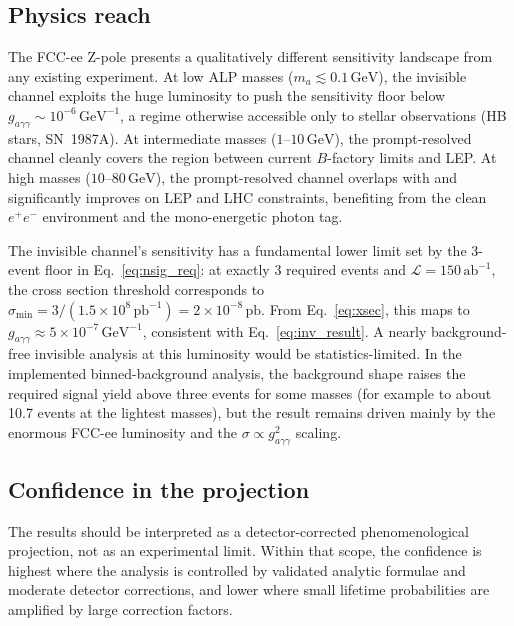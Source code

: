 \documentclass[12pt,a4paper]{article}
\newcommand{\alp}{a}
\newcommand{\gagg}{g_{a\gamma\gamma}}
\newcommand{\Lint}{\mathcal{L}}
\newcommand{\GeV}{\,\text{GeV}}
\newcommand{\abinv}{\,\text{ab}^{-1}}
\begin{document}
\subsection{Physics reach}

The FCC-ee Z-pole presents a qualitatively different sensitivity landscape
from any existing experiment.
At low ALP masses ($m_\alp \lesssim 0.1\GeV$), the invisible channel exploits
the huge luminosity to push the sensitivity floor below
$\gagg \sim 10^{-6}\GeV^{-1}$, a regime otherwise accessible only to
stellar observations (HB stars, SN~1987A).
At intermediate masses ($1$--$10\GeV$), the prompt-resolved channel cleanly
covers the region between current $B$-factory limits and LEP.
At high masses ($10$--$80\GeV$), the prompt-resolved channel overlaps with
and significantly improves on LEP and LHC constraints, benefiting from the
clean $e^+e^-$ environment and the mono-energetic photon tag.

The invisible channel's sensitivity has a fundamental lower limit set by
the 3-event floor in Eq.~\eqref{eq:nsig_req}: at exactly 3 required events
and $\Lint = 150\abinv$, the cross section threshold corresponds to
$\sigma_\mathrm{min} = 3 / (1.5\times10^8\,\text{pb}^{-1})
= 2\times10^{-8}\,\text{pb}$.
From Eq.~\eqref{eq:xsec}, this maps to
$\gagg \approx 5\times10^{-7}\GeV^{-1}$, consistent with
Eq.~\eqref{eq:inv_result}.
A nearly background-free invisible analysis at this luminosity would be
statistics-limited. In the implemented binned-background analysis, the
background shape raises the required signal yield above three events for some
masses (for example to about 10.7 events at the lightest masses), but the
result remains driven mainly by the enormous FCC-ee luminosity and the
$\sigma\propto\gagg^2$ scaling.

\subsection{Confidence in the projection}

The results should be interpreted as a detector-corrected phenomenological
projection, not as an experimental limit. Within that scope, the confidence is
highest where the analysis is controlled by validated analytic formulae and
moderate detector corrections, and lower where small lifetime probabilities
are amplified by large correction factors.
\end{document}
